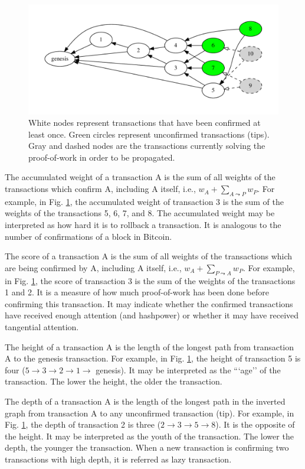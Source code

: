 \begin{figure}[ht]
\centering\includegraphics[width=\textwidth]{./images01/fig-tangle-example.pdf}
\caption{White nodes represent transactions that have been confirmed at least once. Green circles represent unconfirmed transactions (tips). Gray and dashed nodes are the transactions currently solving the proof-of-work in order to be propagated.\label{fig-tangle-example}}
\end{figure}

The accumulated weight of a transaction A is the sum of all weights of the transactions which confirm A, including A itself, i.e., $w_A + \sum_{A \leadsto P} w_P$. For example, in Fig. \ref{fig-tangle-example}, the accumulated weight of transaction 3 is the sum of the weights of the transactions 5, 6, 7, and 8. The accumulated weight may be interpreted as how hard it is to rollback a transaction. It is analogous to the number of confirmations of a block in Bitcoin.

The score of a transaction A is the sum of all weights of the transactions which are being confirmed by A, including A itself, i.e., $w_A + \sum_{P \leadsto A} w_P$. For example, in Fig. \ref{fig-tangle-example}, the score of transaction 3 is the sum of the weights of the transactions 1 and 2. It is a measure of how much proof-of-work has been done before confirming this transaction. It may indicate whether the confirmed transactions have received enough attention (and hashpower) or whether it may have received tangential attention.

The height of a transaction A is the length of the longest path from transaction A to the genesis transaction. For example, in Fig. \ref{fig-tangle-example}, the height of transaction 5 is four ($5 \rightarrow 3 \rightarrow 2 \rightarrow 1 \rightarrow$ genesis). It may be interpreted as the “`age'' of the transaction. The lower the height, the older the transaction.

The depth of a transaction A is the length of the longest path in the inverted graph from transaction A to any unconfirmed transaction (tip). For example, in Fig. \ref{fig-tangle-example}, the depth of transaction 2 is three ($2 \rightarrow 3 \rightarrow 5 \rightarrow 8$). It is the opposite of the height. It may be interpreted as the youth of the transaction. The lower the depth, the younger the transaction. When a new transaction is confirming two transactions with high depth, it is referred as lazy transaction.


